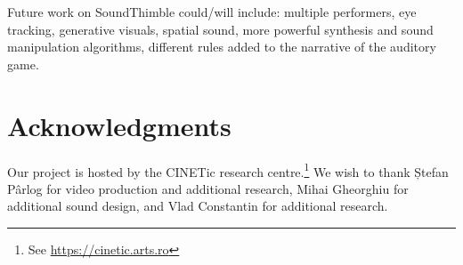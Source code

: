 \documentclass{nime-alternate}
\begin{document}
Future work on SoundThimble could/will include: multiple performers, eye tracking, generative visuals, spatial sound, more powerful synthesis and sound manipulation algorithms, different rules added to the narrative of the auditory game.


\section{Acknowledgments}
Our project is hosted by the CINETic research centre.\footnote{See \url{https://cinetic.arts.ro}} We wish to thank Ștefan Pârlog for video production and additional research, Mihai Gheorghiu for additional sound design, and Vlad Constantin for additional research.

%

 

\end{document}
